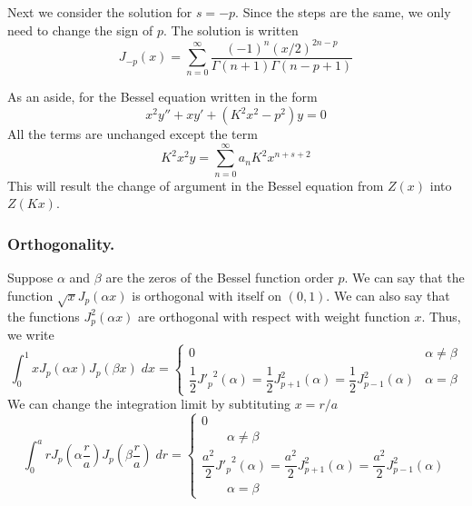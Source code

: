 \documentclass[../main.tex]{subfiles}
\begin{document}
Next we consider the solution for $s=-p$. Since the steps are the same, we only need to change the sign of $p$. The solution is written
\begin{equation*}
    J_{-p} (x)=\sum_{n=0}^{\infty}\frac{(-1)^n(x/2)^{2n-p}}{\Gamma(n+1)\Gamma(n-p+1)}
\end{equation*}

As an aside, for the Bessel equation written in the form 
\begin{equation*}
    x^2y'' +xy' + (K^2x^2- p^2 )y = 0
\end{equation*}
All the terms are unchanged except the term 
\begin{equation*}
    K^2x^2y=\sum_{n=0}^{\infty} a_n K^2x^{n+s+2}
\end{equation*}
This will result the change of argument in the Bessel equation from $Z(x)$ into $Z(Kx)$.

\subsubsection*{Orthogonality.} Suppose $\alpha$ and $\beta$ are the zeros of the Bessel function order $p$. We can say that the function $\sqrt{x}J_p(\alpha x)$ is orthogonal with itself on $(0,1)$. We can also say that the functions $J_p^2(\alpha x)$ are orthogonal with respect with weight function $x$. Thus, we write
\begin{equation*}
    \int_{0}^{1}xJ_p(\alpha x)J_p(\beta x)\;dx=\begin{cases}
        0&\alpha\neq \beta\\
        \dfrac{1}{2}{J'_p}^2(\alpha)=\dfrac{1}{2}J_{p+1}^2(\alpha) =\dfrac{1}{2}J_{p-1}^2(\alpha)&\alpha=\beta
    \end{cases}
\end{equation*}
We can change the integration limit by subtituting $x=r/a$
\begin{equation*}
    \int_{0}^{a}rJ_p\left(\alpha \frac{r}{a}\right)J_p\left(\beta \frac{r}{a}\right)\;dr=\begin{cases}
        0\\
        \qquad \alpha\neq \beta\\
        \dfrac{a^2}{2}{J'_p}^2(\alpha)=\dfrac{a^2}{2}J_{p+1}^2(\alpha) =\dfrac{a^2}{2}J_{p-1}^2(\alpha)\\
        \qquad\alpha=\beta
    \end{cases}
\end{equation*}
\end{document}
